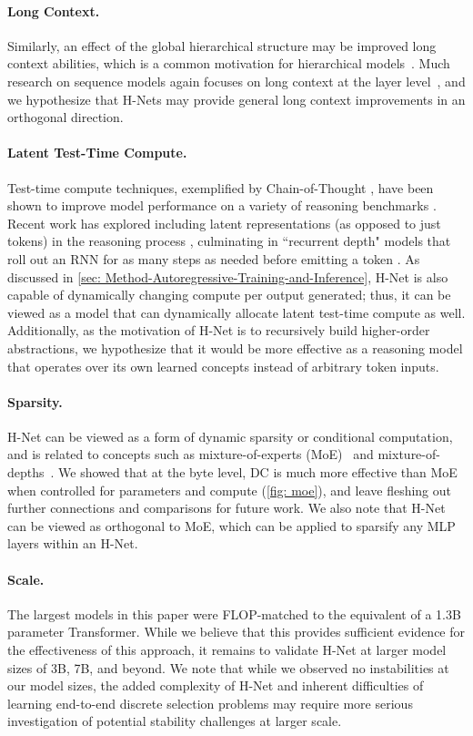 \documentclass{article}
\newcommand{\citep}{\parencite}
\newcommand{\model}{H-Net}
\theoremstyle{plain}
\theoremstyle{remark}
\begin{document}
\paragraph{Long Context.}
Similarly, an effect of the global hierarchical structure may be improved long context abilities, which is a common motivation for hierarchical models~\citep{CW-RNN, DilatedRNN}.
Much research on sequence models again focuses on long context at the layer level~\citep{hyena, Mamba, Transformer}, and we hypothesize that H-Nets may provide general long context improvements in an orthogonal direction.

\paragraph{Latent Test-Time Compute.}
Test-time compute techniques, exemplified by Chain-of-Thought \citep{CoT}, have been shown to improve model performance on a variety of reasoning benchmarks \citep{S1,o1preview}. 
Recent work has explored including latent representations (as opposed to just tokens) in the reasoning process \citep{coconut}, culminating in ``recurrent depth" models that 
roll out an RNN for as many steps as needed before emitting a token \citep{ReccurentDepth}.
As discussed in \cref{sec: Method-Autoregressive-Training-and-Inference}, \model{} is also capable of dynamically changing compute per output generated;
thus, it can be viewed as a model that can dynamically allocate latent test-time compute as well.
Additionally, as the motivation of H-Net is to recursively build higher-order abstractions, we hypothesize that it would be more effective as a reasoning model that operates over its own learned concepts instead of arbitrary token inputs.

\paragraph{Sparsity.}
H-Net can be viewed as a form of dynamic sparsity or conditional computation, and is related to concepts such as mixture-of-experts (MoE)~\citep{MoE, Original-MoE} and mixture-of-depths~\citep{Mixture-of-Depths}.
We showed that at the byte level, DC is much more effective than MoE when controlled for parameters and compute (\cref{fig: moe}), and leave fleshing out further connections and comparisons for future work.
We also note that H-Net can be viewed as orthogonal to MoE, which can be applied to sparsify any MLP layers within an H-Net. 

\paragraph{Scale.}
The largest models in this paper were FLOP-matched to the equivalent of a 1.3B parameter Transformer.
While we believe that this provides sufficient evidence for the effectiveness of this approach, it remains to validate H-Net at larger model sizes of 3B, 7B, and beyond. 
We note that while we observed no instabilities at our model sizes, the added complexity of H-Net and inherent difficulties of learning end-to-end discrete selection problems may require more serious investigation of potential stability challenges at larger scale.
\end{document}
